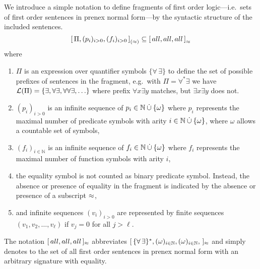 \begin{definition}\label{def:prefix:class}
	We introduce a simple notation to define fragments 
	of first order logic---i.e.~sets of first order sentences in prenex normal form---by 
	the syntactic structure of the included sentences.
	\[
		{[ \, \Pi, (p_i)_{i>0}, (f_i)_{i>0} \, ]}_{(\approx)}
		\subseteq {[\, all, all, all\,]}_{\approx}
	\]
	where 
	\begin{enumerate}
		\item \( \Pi \) is an expression over quantifier symbols 
		\( \{ \forall\,\exists \} \) 
		to define the set of possible prefixes of sentences in the fragment, 
		e.g.~with \( \Pi = \forall^*\exists \) we have 
		\( \mathcal{L}(\Pi) = \{ \exists, \forall \exists, \forall\forall\exists, \ldots \} \)
		where prefix \( \forall x \exists y \) matches,
		but \( \exists x \exists y \) does not.
	\item \( (p_i)_{i>0} \) is an infinite sequence of 
	\( p_i \in \mathbb{N}\mathbin{\dot\cup}\{ \omega \} \) where 
	\( p_i \) represents the maximal number of predicate symbols 
	with arity \( i \in \mathbb{N}\mathbin{\dot\cup}\{ \omega \} \),
	where \( \omega \) allows a countable set of symbols,
	\item \( (f_i)_{i\in\mathbb{N}} \) is an infinite sequence of 
	\( f_i \in \mathbb{N}\mathbin{\dot\cup}\{ \omega \} \) where
	\( f_i \) represents the maximal number of function symbols with arity \( i \),
	\item the equality symbol is not counted as binary predicate symbol. 
	Instead, the absence or presence of equality in the fragment
	is indicated by the absence or presence of a subscript \( \approx \),
% 
	\item and infinite sequences \( (v_i)_{i>0} \) are represented by
	finite sequences \( (v_1,v_2,\ldots,v_\ell) \) if
	\( v_j = 0 \) for all \( j > \ell \).
\end{enumerate}
\begin{remark}
	The notation \( [\,all,all,all\,]_{\approx} \) abbreviates
	\( [\,
		\{\forall\,\exists\}^{*}, 
		(\omega)_{i\in\mathbb{N}},
		(\omega)_{i\in\mathbb{N}},	  
	\,]_{\approx} \) 
	and simply denotes to the set of all 
	first order sentences in prenex normal form
	with an arbitrary signature with equality. 
\end{remark}
\end{definition}


